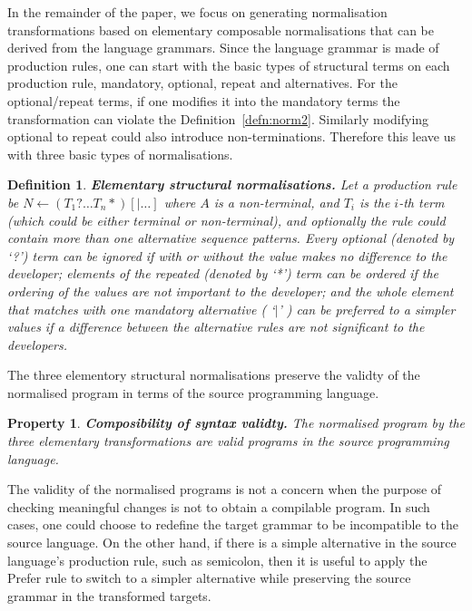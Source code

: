 \documentclass[10pt, conference, compsocconf]{IEEEtran}
\newtheorem{property}{Property}
\newtheorem{definition}{Definition}
\begin{document}
In the remainder of the paper, we focus on generating normalisation transformations based on elementary composable normalisations that can be derived from the language grammars. Since the language grammar is made of production rules,
one can start with the basic types of structural terms on each production rule, mandatory, optional, repeat and alternatives. For the optional/repeat terms, if one modifies it into the mandatory terms the transformation can violate the Definition~\ref{defn:norm2}. Similarly modifying optional to repeat could also introduce non-terminations. Therefore this leave us with three basic types of normalisations.
\begin{definition}
{\bf Elementary structural normalisations.\label{defn:norm3}} Let a production rule be $N \leftarrow (T_1? \ldots T_n*) [| \ldots] $ where $A$ is a non-terminal, and $T_i$ is the $i$-th term (which could be either terminal or non-terminal), and optionally the rule could contain more than one alternative sequence patterns. Every optional (denoted by `?') term can be {\em ignored} if with or without the value makes no difference to the developer; elements of the repeated (denoted by `*') term can be {\em ordered} if the ordering of the values are not important to the developer; and the whole element that matches with one mandatory alternative ( `$|$' )  can be {\em preferred} to a simpler values if a difference between the alternative rules are not significant to the developers.
\end{definition}

The three elementory structural normalisations preserve the validty of the normalised program in terms of the source programming language. %
\begin{property}
{\bf Composibility of syntax validty.\label{defn:norm4}} The normalised program by the three elementary transformations are valid programs in the {\em source} programming language.
\end{property}

The validity of the normalised programs is not a concern when the purpose of checking meaningful changes is not to obtain a compilable program. In such cases, one could choose to redefine the target grammar to be incompatible to the source language. On the other hand, if there is a simple alternative in the source language's production rule, such as semicolon, then it is useful to apply the Prefer rule to switch to a simpler alternative while preserving the source grammar in the transformed targets.
\end{document}
